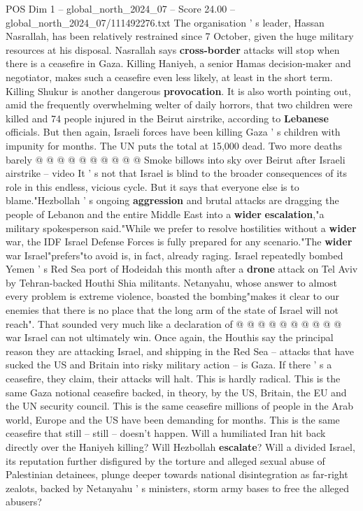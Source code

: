 \begin{textsample}{POS Dim 1 – global\_north\_2024\_07 – Score 24.00 – global\_north\_2024\_07/111492276.txt}
The organisation ' s leader, Hassan Nasrallah, has been relatively restrained since 7 October, given the huge military resources at his disposal.
Nasrallah says \textbf{cross-border} attacks will stop when there is a ceasefire in Gaza.
Killing Haniyeh, a senior Hamas decision-maker and negotiator, makes such a ceasefire even less likely, at least in the short term.
Killing Shukur is another dangerous \textbf{provocation}.
It is also worth pointing out, amid the frequently overwhelming welter of daily horrors, that two children were killed and 74 people injured in the Beirut airstrike, according to \textbf{Lebanese} officials.
But then again, Israeli forces have been killing Gaza ' s children with impunity for months.
The UN puts the total at 15,000 dead.
Two more deaths barely @ @ @ @ @ @ @ @ @ @ Smoke billows into sky over Beirut after Israeli airstrike -- video It ' s not that Israel is blind to the broader consequences of its role in this endless, vicious cycle.
But it says that everyone else is to blame."Hezbollah ' s ongoing \textbf{aggression} and brutal attacks are dragging the people of Lebanon and the entire Middle East into a \textbf{wider} \textbf{escalation},"a military spokesperson said."While we prefer to resolve hostilities without a \textbf{wider} war, the IDF Israel Defense Forces is fully prepared for any scenario."The \textbf{wider} war Israel"prefers"to avoid is, in fact, already raging.
Israel repeatedly bombed Yemen ' s Red Sea port of Hodeidah this month after a \textbf{drone} attack on Tel Aviv by Tehran-backed Houthi Shia militants.
Netanyahu, whose answer to almost every problem is extreme violence, boasted the bombing"makes it clear to our enemies that there is no place that the long arm of the state of Israel will not reach".
That sounded very much like a declaration of @ @ @ @ @ @ @ @ @ @ war Israel can not ultimately win.
Once again, the Houthis say the principal reason they are attacking Israel, and shipping in the Red Sea -- attacks that have sucked the US and Britain into risky military action -- is Gaza.
If there ' s a ceasefire, they claim, their attacks will halt.
This is hardly radical.
This is the same Gaza notional ceasefire backed, in theory, by the US, Britain, the EU and the UN security council.
This is the same ceasefire millions of people in the Arab world, Europe and the US have been demanding for months.
This is the same ceasefire that still -- still -- doesn't happen.
Will a humiliated Iran hit back directly over the Haniyeh killing?
Will Hezbollah \textbf{escalate}?
Will a divided Israel, its reputation further disfigured by the torture and alleged sexual abuse of Palestinian detainees, plunge deeper towards national disintegration as far-right zealots, backed by Netanyahu ' s ministers, storm army bases to free the alleged abusers?

\end{textsample}
